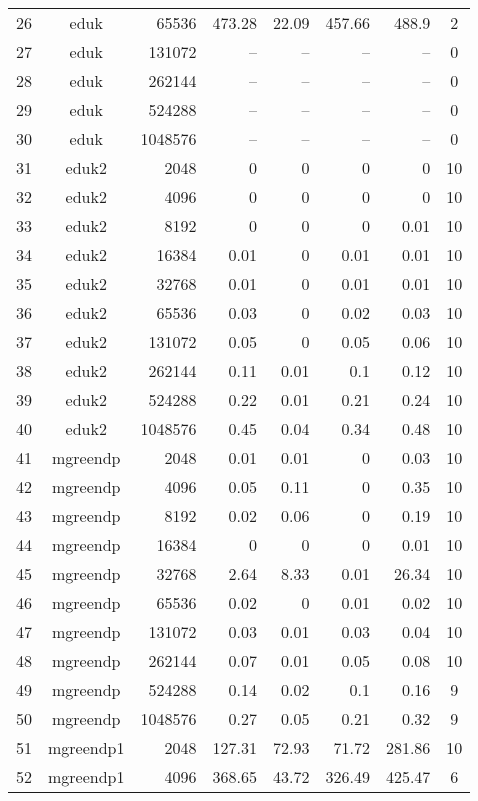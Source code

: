 \begin{longtable}{rcrrrrrc}
  26 & eduk & 65536 & 473.28 & 22.09 & 457.66 & 488.9 &   2 \\ 
  27 & eduk & 131072 & -- & -- & -- & -- &   0 \\ 
  28 & eduk & 262144 & -- & -- & -- & -- &   0 \\ 
  29 & eduk & 524288 & -- & -- & -- & -- &   0 \\ 
  30 & eduk & 1048576 & -- & -- & -- & -- &   0 \\ 
  31 & eduk2 & 2048 & 0 & 0 & 0 & 0 &  10 \\ 
  32 & eduk2 & 4096 & 0 & 0 & 0 & 0 &  10 \\ 
  33 & eduk2 & 8192 & 0 & 0 & 0 & 0.01 &  10 \\ 
  34 & eduk2 & 16384 & 0.01 & 0 & 0.01 & 0.01 &  10 \\ 
  35 & eduk2 & 32768 & 0.01 & 0 & 0.01 & 0.01 &  10 \\ 
  36 & eduk2 & 65536 & 0.03 & 0 & 0.02 & 0.03 &  10 \\ 
  37 & eduk2 & 131072 & 0.05 & 0 & 0.05 & 0.06 &  10 \\ 
  38 & eduk2 & 262144 & 0.11 & 0.01 & 0.1 & 0.12 &  10 \\ 
  39 & eduk2 & 524288 & 0.22 & 0.01 & 0.21 & 0.24 &  10 \\ 
  40 & eduk2 & 1048576 & 0.45 & 0.04 & 0.34 & 0.48 &  10 \\ 
  41 & mgreendp & 2048 & 0.01 & 0.01 & 0 & 0.03 &  10 \\ 
  42 & mgreendp & 4096 & 0.05 & 0.11 & 0 & 0.35 &  10 \\ 
  43 & mgreendp & 8192 & 0.02 & 0.06 & 0 & 0.19 &  10 \\ 
  44 & mgreendp & 16384 & 0 & 0 & 0 & 0.01 &  10 \\ 
  45 & mgreendp & 32768 & 2.64 & 8.33 & 0.01 & 26.34 &  10 \\ 
  46 & mgreendp & 65536 & 0.02 & 0 & 0.01 & 0.02 &  10 \\ 
  47 & mgreendp & 131072 & 0.03 & 0.01 & 0.03 & 0.04 &  10 \\ 
  48 & mgreendp & 262144 & 0.07 & 0.01 & 0.05 & 0.08 &  10 \\ 
  49 & mgreendp & 524288 & 0.14 & 0.02 & 0.1 & 0.16 &   9 \\ 
  50 & mgreendp & 1048576 & 0.27 & 0.05 & 0.21 & 0.32 &   9 \\ 
  51 & mgreendp1 & 2048 & 127.31 & 72.93 & 71.72 & 281.86 &  10 \\ 
  52 & mgreendp1 & 4096 & 368.65 & 43.72 & 326.49 & 425.47 &   6 \\ 

\end{longtable}
